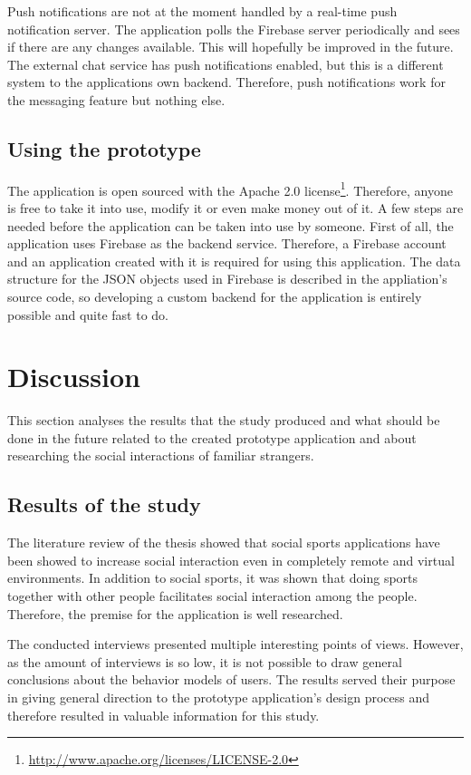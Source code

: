Push notifications are not at the moment handled by a real-time push notification server. The application polls the Firebase server periodically and sees if there are any changes available. This will hopefully be improved in the future. The external chat service has push notifications enabled, but this is a different system to the applications own backend. Therefore, push notifications work for the messaging feature but nothing else.

\subsection{Using the prototype}

The application is open sourced with the Apache 2.0 license\footnote{\url{http://www.apache.org/licenses/LICENSE-2.0}}. Therefore, anyone is free to take it into use, modify it or even make money out of it. A few steps are needed before the application can be taken into use by someone. First of all, the application uses Firebase as the backend service. Therefore, a Firebase account and an application created with it is required for using this application. The data structure for the JSON objects used in Firebase is described in the appliation's source code, so developing a custom backend for the application is entirely possible and quite fast to do.

\section{Discussion}

This section analyses the results that the study produced and what should be done in the future related to the created prototype application and about researching the social interactions of familiar strangers.

\subsection{Results of the study}

The literature review of the thesis showed that social sports applications have been showed to increase social interaction even in completely remote and virtual environments. In addition to social sports, it was shown that doing sports together with other people facilitates social interaction among the people. Therefore, the premise for the application  is well researched.

The conducted interviews presented multiple interesting points of views. However, as the amount of interviews is so low, it is not possible to draw general conclusions about the behavior models of users. The results served their purpose in giving general direction to the prototype application's design process and therefore resulted in valuable information for this study.

